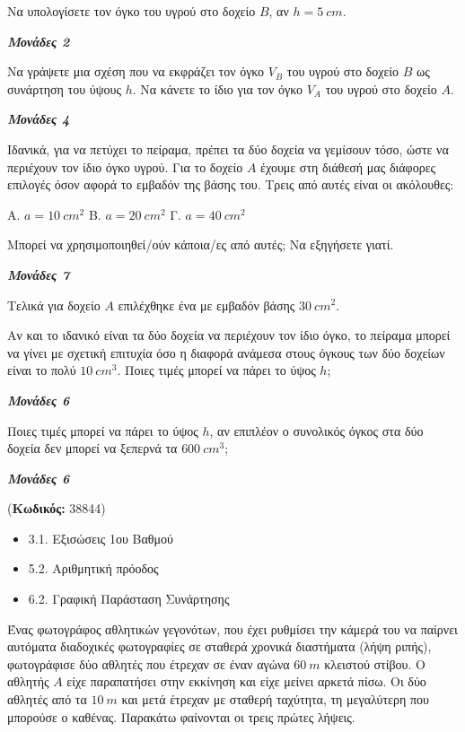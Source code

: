 \documentclass[11pt,a4paper,twoside]{book}
\newcounter{askhsh}[chapter]
\renewcommand{\theaskhsh}{
	\bf{\titlefont{\Large{\thechapter}}.\arabic{askhsh}}
}
\newcommand{\Askhsh}[2]{\refstepcounter{askhsh}{\titlefont{Άσκηση\theaskhsh} - \textcolor{maincolor}{ΘΕΜΑ #2}} ({\small{\textbf{Κωδικός:} #1}})\\}{}
\newenvironment{ylh}{
\begin{tcolorbox}[
breakable,
enhanced standard,
titlerule=0pt,
toprule=0pt, 
rightrule=0pt, 
bottomrule=0pt,
title={\titlefont Ύλη άσκησης},
colback=white,
opacityback=0,
left=2mm,
top=1mm,
bottom=0mm,
boxrule=0pt,
colframe=white,
borderline west={1.5mm}{0pt}{secondarycolor},
leftrule=2mm,
sharp corners,
coltitle=black
]
\begin{itemize}[leftmargin=3mm, itemsep=0mm, label=\textcolor{secondarycolor}{{\small\faBook}}]
}{
\end{itemize}
\end{tcolorbox}
}
\newcommand{\monades}[1]{
\hspace*{\fill}
\textbf{\textit{\textcolor{maincolor}{Μονάδες #1}}}}
\begin{document}
\begin{alist}
\item

\begin{rlist}
\item Να υπολογίσετε τον όγκο του υγρού στο δοχείο $B$, αν $h = 5\ cm$.
\monades{2}
\item Να γράψετε μια σχέση που να εκφράζει τον όγκο $V_{B}$ του υγρού στο δοχείο $B$ ως συνάρτηση του ύψους $h$. Να κάνετε το ίδιο για τον όγκο $V_{A}$ του υγρού στο δοχείο $A$.
\monades{4}
\end{rlist}
\item Ιδανικά, για να πετύχει το πείραμα, πρέπει τα δύο δοχεία να γεμίσουν τόσο, ώστε να περιέχουν τον ίδιο όγκο υγρού. Για το δοχείο $A$ έχουμε στη διάθεσή μας διάφορες επιλογές όσον αφορά το εμβαδόν της βάσης του. Τρεις από αυτές είναι οι ακόλουθες:

Α. $a = 10\ cm^{2}$ \quad Β. $a = 20\ cm^{2}$ \quad Γ. $a = 40\ cm^{2}$

Μπορεί να χρησιμοποιηθεί/ούν κάποια/ες από αυτές; Να εξηγήσετε γιατί.
\monades{7}
\item Τελικά για δοχείο $A$ επιλέχθηκε ένα με εμβαδόν βάσης $30\ cm^{2}$.

\begin{rlist}
\item Αν και το ιδανικό είναι τα δύο δοχεία να περιέχουν τον ίδιο όγκο, το πείραμα μπορεί να γίνει με σχετική επιτυχία όσο η διαφορά ανάμεσα στους όγκους των δύο δοχείων είναι το πολύ $10\ cm^{3}$. Ποιες τιμές μπορεί να πάρει το ύψος $h$;
\monades{6}
\item Ποιες τιμές μπορεί να πάρει το ύψος $h$, αν επιπλέον ο συνολικός όγκος στα δύο δοχεία δεν μπορεί να ξεπερνά τα $600\ cm^{3}$;
\monades{6}
\end{rlist}
\end{alist}

\vspace{4mm}
\Askhsh{38844}{4}
\begin{ylh}
    \item 3.1. Εξισώσεις 1ου Βαθμού
    \item 5.2. Αριθμητική πρόοδος
    \item 6.2. Γραφική Παράσταση Συνάρτησης
\end{ylh}

Ένας φωτογράφος αθλητικών γεγονότων, που έχει ρυθμίσει την κάμερά του να παίρνει αυτόματα διαδοχικές φωτογραφίες σε σταθερά χρονικά διαστήματα (λήψη ριπής), φωτογράφισε δύο αθλητές που έτρεχαν σε έναν αγώνα $60\ m$ κλειστού στίβου. Ο αθλητής $A$ είχε παραπατήσει στην εκκίνηση και είχε μείνει αρκετά πίσω. Οι δύο αθλητές από τα $10\ m$ και μετά έτρεχαν με σταθερή ταχύτητα, τη μεγαλύτερη που μπορούσε ο καθένας. Παρακάτω φαίνονται οι τρεις πρώτες λήψεις.
\end{document}
